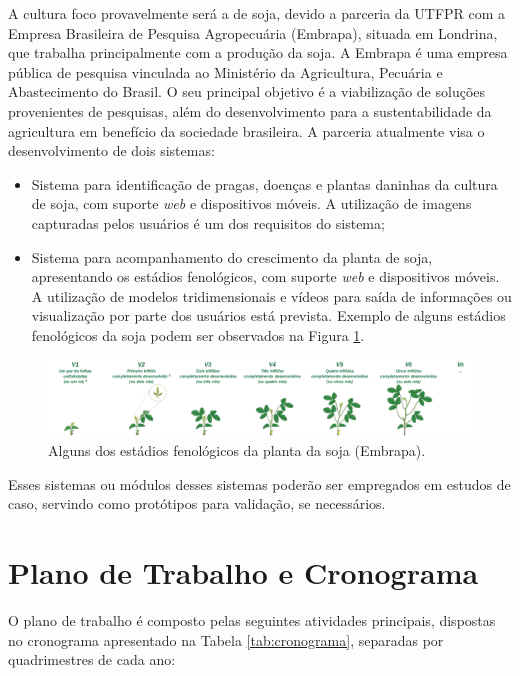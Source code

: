 \documentclass[12pt]{article}
\begin{document}
A cultura foco provavelmente será a de soja, devido a parceria da UTFPR com a Empresa Brasileira de Pesquisa Agropecuária (Embrapa), situada em Londrina, que trabalha principalmente com a produção da soja. A Embrapa é uma empresa pública de pesquisa vinculada ao Ministério da Agricultura, Pecuária e Abastecimento do Brasil. O seu principal objetivo é a viabilização de soluções provenientes de pesquisas, além do desenvolvimento para a sustentabilidade da agricultura em benefício da sociedade brasileira. A parceria atualmente visa o desenvolvimento de dois sistemas:

\begin{itemize}
	\item Sistema para identificação de pragas, doenças e plantas daninhas da cultura de soja, com suporte \textit{web} e dispositivos móveis. A utilização de imagens capturadas pelos usuários é um dos requisitos do sistema;

	\item Sistema para acompanhamento do crescimento da planta de soja, apresentando os estádios fenológicos, com suporte \textit{web} e dispositivos móveis. A utilização de modelos tridimensionais e vídeos para saída de informações ou visualização por parte dos usuários está prevista. Exemplo de alguns estádios fenológicos da soja podem ser observados na Figura \ref{fig:estadios_fenelogicos}.
\end{itemize}

\begin{figure}
	\centering
  \includegraphics[scale=0.5]{images/EstadiosFenologicos.png}
  \caption{Alguns dos estádios fenológicos da planta da soja (Embrapa).}
  \label{fig:estadios_fenelogicos}
\end{figure} 

Esses sistemas ou módulos desses sistemas poderão ser empregados em estudos de caso, servindo como protótipos para validação, se necessários. 

\section{Plano de Trabalho e Cronograma}
\label{sec:plano_trabalho_cronograma}

O plano de trabalho é composto pelas seguintes atividades principais, dispostas no cronograma apresentado na Tabela \ref{tab:cronograma}, separadas por quadrimestres de cada ano:
\end{document}
